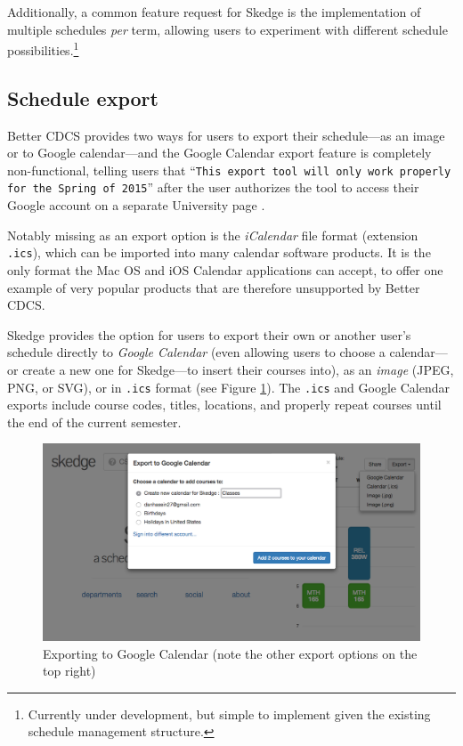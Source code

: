 Additionally, a common feature request for Skedge is the implementation of multiple schedules \emph{per} term, allowing users to experiment with different schedule possibilities.\footnote{Currently under development, but simple to implement given the existing schedule management structure.}

\subsection{Schedule export}

Better CDCS provides two ways for users to export their schedule---as an image or to Google calendar---and the Google Calendar export feature is completely non-functional, telling users that ``{\tt This export tool will only work properly for the Spring of 2015}'' after the user authorizes the tool to access their Google account on a separate University page \cite{cdcs-google}.

Notably missing as an export option is the \emph{iCalendar} file format (extension {\tt .ics}), which can be imported into many calendar software products. It is the only format the Mac OS and iOS Calendar applications can accept, to offer one example of very popular products that are therefore unsupported by Better CDCS.

Skedge provides the option for users to export their own or another user's schedule directly to \emph{Google Calendar} (even allowing users to choose a calendar---or create a new one for Skedge---to insert their courses into), as an \emph{image} (JPEG, PNG, or SVG), or in {\tt .ics} format (see Figure \ref{fig:sk-export}). The {\tt .ics} and Google Calendar exports include course codes, titles, locations, and properly repeat courses until the end of the current semester.

\vspace{20pt}

\begin{figure}[ht]
  \centering
  \vspace{2pt}
  \includegraphics[width=14cm]{images/skedge/export}
  \caption{Exporting to Google Calendar (note the other export options on the top right)} \label{fig:sk-export}
\end{figure}

\clearpage